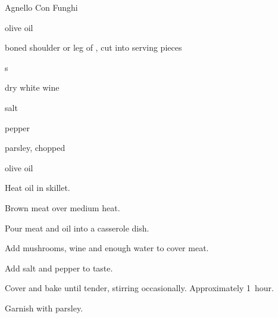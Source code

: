\begin{recipe}{Agnello Con Funghi}{}{}

\begin{ingredients}
\item {} olive oil
\item {} boned shoulder or leg of , cut into serving pieces
\item {} s
\item {} dry white wine
\item salt
\item pepper
\item parsley, chopped
\item olive oil
\end{ingredients}

\begin{directions}
\item Heat oil in skillet.
\item Brown meat over medium heat.
\item Pour meat and oil into a casserole dish.
\item Add mushrooms, wine and enough water to cover meat.
\item Add salt and pepper to taste.
\item Cover and bake until tender, stirring occasionally. Approximately 1~hour.
\item Garnish with parsley.
\end{directions}

\end{recipe}
